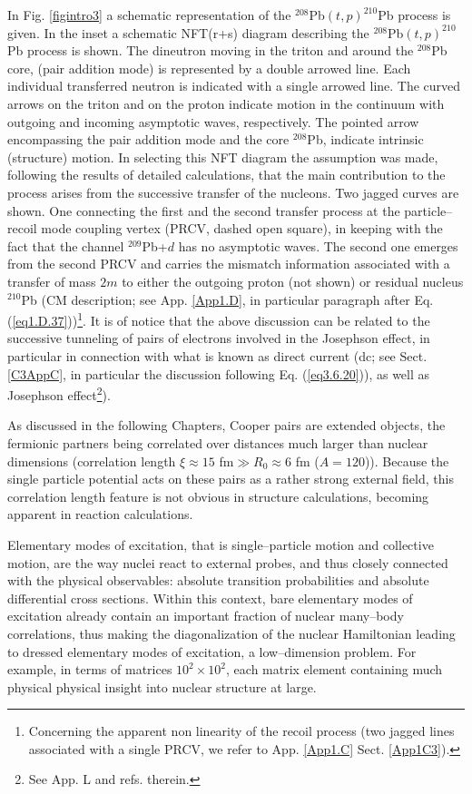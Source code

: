 In Fig. \ref{figintro3} a schematic representation of the $^{208}$Pb$(t,p)^{210}$Pb process is given. In the inset  a schematic NFT(r+s) diagram describing the $^{208}$Pb$(t,p)^{210}$Pb process is shown. The dineutron  moving in the triton and around the $^{208}$Pb core, (pair addition mode) is represented by a double arrowed line. Each individual transferred neutron is indicated with a single arrowed line. The curved arrows on the triton and on the proton indicate motion in the continuum with outgoing and incoming asymptotic waves, respectively. The pointed arrow encompassing the pair addition mode and the core $^{208}$Pb, indicate intrinsic (structure) motion. In selecting this NFT diagram  the assumption was made, following the results of detailed calculations, that the main contribution to the process arises from the successive transfer of the nucleons. Two jagged curves are shown. One connecting the first and the second transfer process at the particle--recoil mode coupling vertex (PRCV, dashed open square), in keeping with the fact that the channel $^{209}$Pb+$d$ has no asymptotic waves. The second one emerges from the second PRCV and carries the mismatch information associated with a transfer of mass $2m$ to either the outgoing proton (not shown) or residual nucleus $^{210}$Pb (CM description; see App. \ref{App1.D}, in particular paragraph after Eq. (\ref{eq1.D.37}))\footnote{Concerning the apparent non linearity of the recoil process (two jagged lines associated with a single PRCV, we refer to App. \ref{App1.C} Sect. \ref{App1C3}).}. It is of notice that the above discussion can be related to the successive tunneling of pairs of electrons involved in the Josephson effect, in particular in connection with what is known as direct current (dc; see Sect. \ref{C3AppC}, in particular the discussion following Eq. (\ref{eq3.6.20})), as well as  Josephson effect\footnote{See \cite{Brink:05} App. L and refs. therein.}). 


As discussed in the following Chapters, Cooper pairs are extended objects, the fermionic partners being correlated over distances much larger than nuclear dimensions (correlation length $\xi\approx15$ fm$\gg R_0\approx 6$ fm ($A=120$)). Because the single particle potential acts on these pairs as a rather strong external field, this correlation length feature is not obvious in structure calculations, becoming apparent in reaction calculations. 


Elementary modes of excitation, that is single--particle motion and collective motion, are the way nuclei react to external probes, and thus closely connected with the  physical observables: absolute transition probabilities and absolute differential cross sections. Within this context, bare elementary modes of excitation already contain an important fraction of nuclear many--body correlations,  thus making the diagonalization of the nuclear Hamiltonian leading to dressed elementary modes of excitation, a low--dimension problem. For example, in terms of matrices $10^2\times10^2$, each matrix element containing much physical physical insight into nuclear structure at large. 


